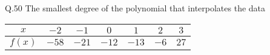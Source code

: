 \documentclass{article}
\begin{document}
																																																																																																	       \newpage
																																																																																																	       Q.50 \quad The smallest degree of the polynomial that interpolates the data
																																																																																																	          \begin{center}
																																																																																																		  \begin{tabular}{|c|c|c|c|c|c|c|}
																																																																																																		  \hline
																																																																																																		  $x$     & $-2$ & $-1$ & $0$ & $1$ & $2$ & $3$ \\
																																																																																																		  \hline
																																																																																																		  $f(x)$  & $-58$ & $-21$ & $-12$ & $-13$ & $-6$ & $27$ \\
																																																																																																		  \hline
																																																																																																		  \end{tabular}
																																																																																																		  \end{center}
\end{document}
